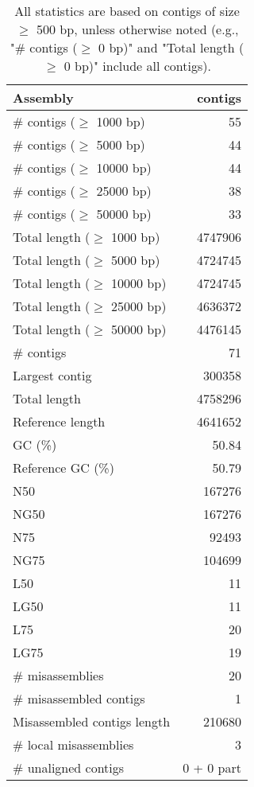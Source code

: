 \documentclass[12pt,a4paper]{article}
\begin{document}
\begin{table}[ht]
\begin{center}
\caption{All statistics are based on contigs of size $\geq$ 500 bp, unless otherwise noted (e.g., "\# contigs ($\geq$ 0 bp)" and "Total length ($\geq$ 0 bp)" include all contigs).}
\begin{tabular}{|l*{1}{|r}|}
\hline
Assembly & contigs \\ \hline
\# contigs ($\geq$ 1000 bp) & 55 \\ \hline
\# contigs ($\geq$ 5000 bp) & 44 \\ \hline
\# contigs ($\geq$ 10000 bp) & 44 \\ \hline
\# contigs ($\geq$ 25000 bp) & 38 \\ \hline
\# contigs ($\geq$ 50000 bp) & 33 \\ \hline
Total length ($\geq$ 1000 bp) & 4747906 \\ \hline
Total length ($\geq$ 5000 bp) & 4724745 \\ \hline
Total length ($\geq$ 10000 bp) & 4724745 \\ \hline
Total length ($\geq$ 25000 bp) & 4636372 \\ \hline
Total length ($\geq$ 50000 bp) & 4476145 \\ \hline
\# contigs & 71 \\ \hline
Largest contig & 300358 \\ \hline
Total length & 4758296 \\ \hline
Reference length & 4641652 \\ \hline
GC (\%) & 50.84 \\ \hline
Reference GC (\%) & 50.79 \\ \hline
N50 & 167276 \\ \hline
NG50 & 167276 \\ \hline
N75 & 92493 \\ \hline
NG75 & 104699 \\ \hline
L50 & 11 \\ \hline
LG50 & 11 \\ \hline
L75 & 20 \\ \hline
LG75 & 19 \\ \hline
\# misassemblies & 20 \\ \hline
\# misassembled contigs & 1 \\ \hline
Misassembled contigs length & 210680 \\ \hline
\# local misassemblies & 3 \\ \hline
\# unaligned contigs & 0 + 0 part \\ \hline

\end{tabular}
\end{center}
\end{table}
\end{document}

